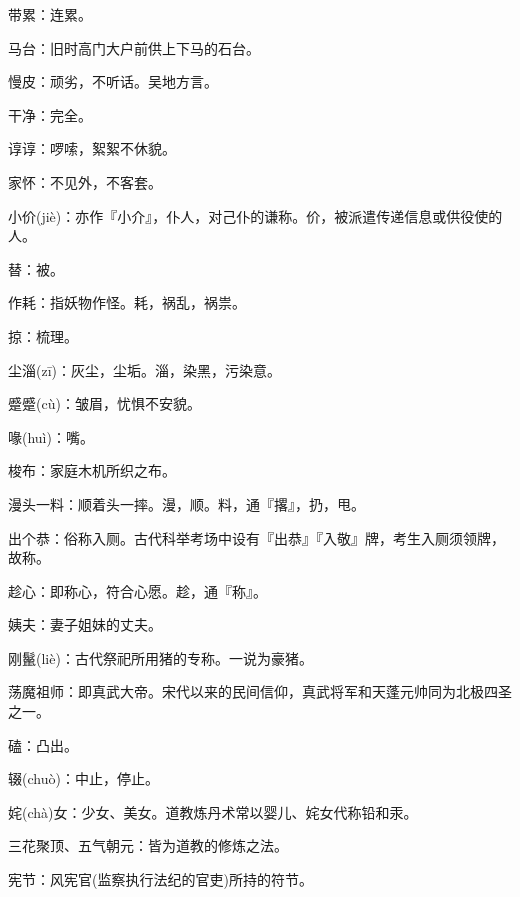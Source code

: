 \startbuffer[737]
带累：连累。
\stopbuffer


\startbuffer[738]
马台：旧时高门大户前供上下马的石台。
\stopbuffer


\startbuffer[739]
慢皮：顽劣，不听话。吴地方言。
\stopbuffer


\startbuffer[740]
干净：完全。
\stopbuffer


\startbuffer[741]
谆谆：啰嗦，絮絮不休貌。
\stopbuffer


\startbuffer[742]
家怀：不见外，不客套。
\stopbuffer


\startbuffer[743]
小价(jiè)：亦作『小介』，仆人，对己仆的谦称。价，被派遣传递信息或供役使的人。
\stopbuffer


\startbuffer[744]
替：被。
\stopbuffer


\startbuffer[745]
作耗：指妖物作怪。耗，祸乱，祸祟。
\stopbuffer


\startbuffer[746]
掠：梳理。
\stopbuffer


\startbuffer[747]
尘淄(zī)：灰尘，尘垢。淄，染黑，污染意。
\stopbuffer


\startbuffer[748]
蹙蹙(cù)：皱眉，忧惧不安貌。
\stopbuffer


\startbuffer[749]
喙(huì)：嘴。
\stopbuffer


\startbuffer[750]
梭布：家庭木机所织之布。
\stopbuffer


\startbuffer[751]
漫头一料：顺着头一摔。漫，顺。料，通『撂』，扔，甩。
\stopbuffer


\startbuffer[752]
出个恭：俗称入厕。古代科举考场中设有『出恭』『入敬』牌，考生入厕须领牌，故称。
\stopbuffer


\startbuffer[753]
趁心：即称心，符合心愿。趁，通『称』。
\stopbuffer


\startbuffer[754]
姨夫：妻子姐妹的丈夫。
\stopbuffer


\startbuffer[755]
刚鬣(liè)：古代祭祀所用猪的专称。一说为豪猪。
\stopbuffer


\startbuffer[756]
荡魔祖师：即真武大帝。宋代以来的民间信仰，真武将军和天蓬元帅同为北极四圣之一。
\stopbuffer


\startbuffer[757]
磕：凸出。
\stopbuffer


\startbuffer[758]
辍(chuò)：中止，停止。
\stopbuffer


\startbuffer[759]
姹(chà)女：少女、美女。道教炼丹术常以婴儿、姹女代称铅和汞。
\stopbuffer


\startbuffer[760]
三花聚顶、五气朝元：皆为道教的修炼之法。
\stopbuffer


\startbuffer[761]
宪节：风宪官(监察执行法纪的官吏)所持的符节。
\stopbuffer


